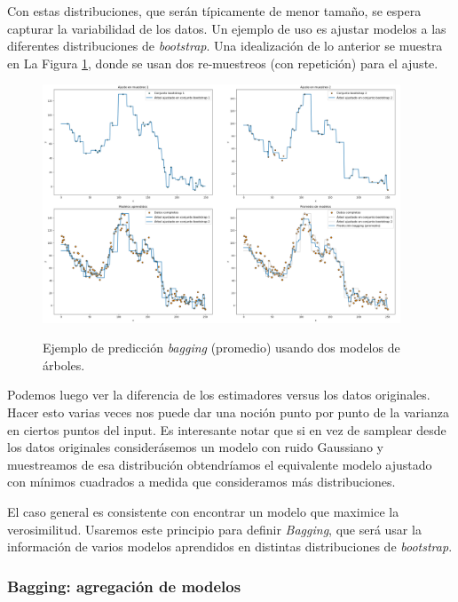 Con estas distribuciones, que serán típicamente de menor tamaño, se espera capturar la variabilidad de los datos. Un ejemplo de uso es ajustar modelos a las diferentes distribuciones de \textit{bootstrap}. Una idealización de lo anterior se muestra en La Figura \ref{fig:bagging}, donde se usan dos re-muestreos (con repetición) para el ajuste.

\begin{figure}[H]
    \centering
    \includegraphics[width=0.95\textwidth]{img/capN_bagging_ejemplo.png}\\
    \caption{Ejemplo de predicción \textit{bagging} (promedio) usando dos modelos de árboles.}
    \label{fig:bagging}
\end{figure}

Podemos luego ver la diferencia de los estimadores versus los datos originales. Hacer esto varias veces nos puede dar una noción punto por punto de la varianza en ciertos puntos del input. Es interesante notar que si en vez de samplear desde los datos originales considerásemos un modelo con ruido Gaussiano y muestreamos de esa distribución obtendríamos el equivalente modelo ajustado con mínimos cuadrados a medida que consideramos más distribuciones.

El caso general es consistente con encontrar un modelo que maximice la verosimilitud. Usaremos este principio para definir \textit{Bagging}, que será usar la información de varios modelos aprendidos en distintas distribuciones de \textit{bootstrap}.


\subsubsection{Bagging: agregación de modelos}

